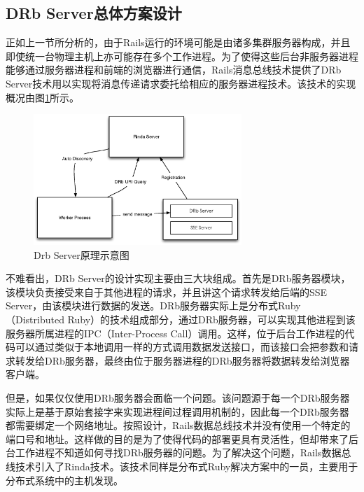 \subsection{DRb Server总体方案设计}

正如上一节所分析的，由于Rails运行的环境可能是由诸多集群服务器构成，并且即使统一台物理主机上亦可能存在多个工作进程。为了使得这些后台非服务器进程能够通过服务器进程和前端的浏览器进行通信，Rails消息总线技术提供了DRb Server技术用以实现将消息传递请求委托给相应的服务器进程技术。该技术的实现概况由图\ref{fig-drb}所示。

\begin{figure}[h]
\centering
\includegraphics[width=0.7\textwidth]{images/overview/drb.eps}
\caption{Drb Server原理示意图}
\label{fig-drb}
\end{figure}

不难看出，DRb Server的设计实现主要由三大块组成。首先是DRb服务器模块，该模块负责接受来自于其他进程的请求，并且讲这个请求转发给后端的SSE Server，由该模块进行数据的发送。DRb服务器实际上是分布式Ruby（Distributed Ruby）的技术组成部分，通过DRb服务器，可以实现其他进程到该服务器所属进程的IPC（Inter-Process Call）调用。这样，位于后台工作进程的代码可以通过类似于本地调用一样的方式调用数据发送接口，而该接口会把参数和请求转发给DRb服务器，最终由位于服务器进程的DRb服务器将数据转发给浏览器客户端。

但是，如果仅仅使用DRb服务器会面临一个问题。该问题源于每一个DRb服务器实际上是基于原始套接字来实现进程间过程调用机制的，因此每一个DRb服务器都需要绑定一个网络地址。按照设计，Rails数据总线技术并没有使用一个特定的端口号和地址。这样做的目的是为了使得代码的部署更具有灵活性，但却带来了后台工作进程不知道如何寻找DRb服务器的问题。为了解决这个问题，Rails数据总线技术引入了Rinda技术。该技术同样是分布式Ruby解决方案中的一员，主要用于分布式系统中的主机发现。

